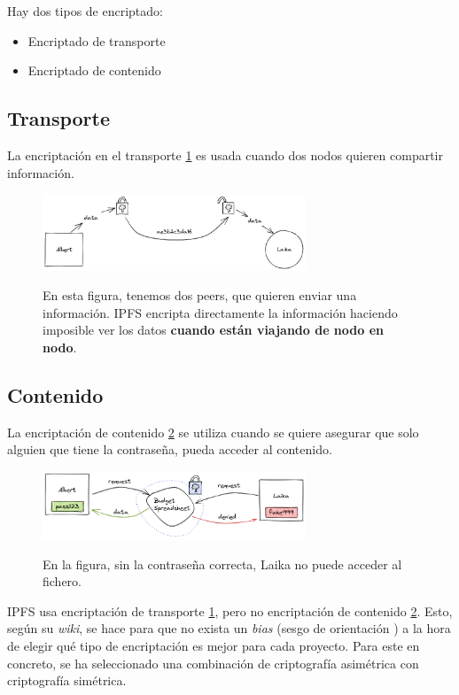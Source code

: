 Hay dos tipos de encriptado:
\begin{itemize}
    \item Encriptado de transporte
    \item Encriptado de contenido
\end{itemize}
\subsection{Transporte}
La encriptación en el transporte \ref{fg:trasnporte} es usada cuando dos nodos quieren compartir información.
\begin{center}
    \begin{figure}[h!]
        \centering
        \includegraphics[width=0.7\textwidth]{Figures/transport-encryption.033b6a51.png}
        \caption{En esta figura, tenemos dos peers, que quieren enviar una información. IPFS encripta directamente la información haciendo imposible ver los datos \textbf{cuando están viajando de nodo en nodo}.}
        \label{fg:trasnporte}
        \cite{web:bias}
    \end{figure}
\end{center}
\subsection{Contenido}
La encriptación de contenido \ref{fg:contenido} se utiliza cuando se quiere asegurar que solo alguien que tiene la contraseña, pueda acceder al contenido.
\begin{center}
    \begin{figure}[h!]
        \centering
        \includegraphics[width=0.7\textwidth]{Figures/content-encryption.adc5de58.png}
        \caption{En la figura, sin la contraseña correcta, Laika no puede acceder al fichero.}
        \label{fg:contenido}
        \cite{web:bias}
    \end{figure}
\end{center}
IPFS usa encriptación de transporte \ref{fg:trasnporte}, pero no encriptación de contenido \ref{fg:contenido}. Esto, según su \textit{wiki}, se hace para que no exista un \textit{bias} (sesgo de orientación \cite{web:bias}) a la hora de elegir qué tipo de encriptación es mejor para cada proyecto. Para este en concreto, se ha seleccionado una combinación de criptografía asimétrica con criptografía simétrica.
